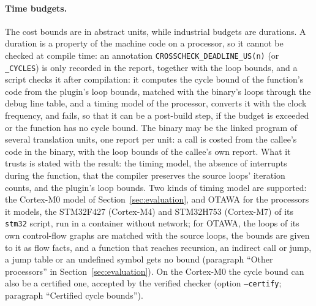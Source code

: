 \documentclass[oneside,english]{amsart}
\numberwithin{equation}{section}
\theoremstyle{plain}
\theoremstyle{definition}
\theoremstyle{plain}
\theoremstyle{plain}
\theoremstyle{remark}
\begin{document}
\paragraph{Time budgets.}
The cost bounds are in abstract units, while industrial budgets are durations. A duration is a property of the machine code on a processor, so it cannot be checked at compile time: an annotation \texttt{CROSSCHECK\_DEADLINE\_US(n)} (or \texttt{\_CYCLES}) is only recorded in the report, together with the loop bounds, and a script checks it after compilation: it computes the cycle bound of the function's code from the plugin's loop bounds, matched with the binary's loops through the debug line table, and a timing model of the processor, converts it with the clock frequency, and fails, so that it can be a post-build step, if the budget is exceeded or the function has no cycle bound. The binary may be the linked program of several translation units, one report per unit: a call is costed from the callee's code in the binary, with the loop bounds of the callee's own report. What it trusts is stated with the result: the timing model, the absence of interrupts during the function, that the compiler preserves the source loops' iteration counts, and the plugin's loop bounds. Two kinds of timing model are supported: the Cortex-M0 model of Section~\ref{sec:evaluation}, and OTAWA \cite{ballabriga2010otawa} for the processors it models, the STM32F427 (Cortex-M4) and STM32H753 (Cortex-M7) of its \texttt{stm32} script, run in a container without network; for OTAWA, the loops of its own control-flow graphs are matched with the source loops, the bounds are given to it as flow facts, and a function that reaches recursion, an indirect call or jump, a jump table or an undefined symbol gets no bound (paragraph ``Other processors'' in Section~\ref{sec:evaluation}). On the Cortex-M0 the cycle bound can also be a certified one, accepted by the verified checker (option \texttt{--certify}; paragraph ``Certified cycle bounds'').
\end{document}
